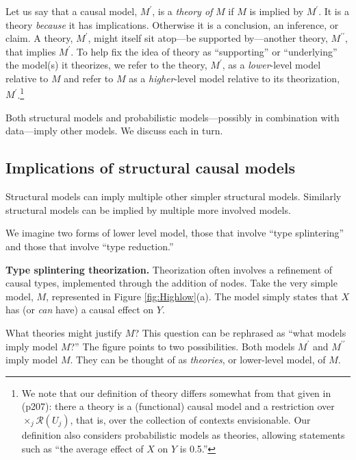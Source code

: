 \documentclass[
  12pt,
]{book}
\begin{document}
Let us say that a causal model, \(M^\prime\), is a \emph{theory of} \(M\) if \(M\) is implied by \(M^\prime\). It is a theory \emph{because} it has implications. Otherwise it is a conclusion, an inference, or claim. A theory, \(M^\prime\), might itself sit atop---be supported by---another theory, \(M^{\prime\prime}\), that implies \(M^\prime\). To help fix the idea of theory as ``supporting'' or ``underlying'' the model(s) it theorizes, we refer to the theory, \(M^\prime\), as a \emph{lower}-level model relative to \(M\) and refer to \(M\) as a \emph{higher}-level model relative to its theorization, \(M^\prime\).\footnote{We note that our definition of theory differs somewhat from that given in \citet{pearl2009causality} (p207): there a theory is a (functional) causal model and a restriction over \(\times_j \mathcal{R}(U_j)\), that is, over the collection of contexts envisionable. Our definition also considers probabilistic models as theories, allowing statements such as ``the average effect of \(X\) on \(Y\) is 0.5.''}

Both structural models and probabilistic models---possibly in combination with data---imply other models. We discuss each in turn.

\hypertarget{implications-of-structural-causal-models}{%
\subsection{Implications of structural causal models}\label{implications-of-structural-causal-models}}

Structural models can imply multiple other simpler structural models. Similarly structural models can be implied by multiple more involved models.

We imagine two forms of lower level model, those that involve ``type splintering'' and those that involve ``type reduction.''

\textbf{Type splintering theorization.} Theorization often involves a refinement of causal types, implemented through the addition of nodes.
Take the very simple model, \(M\), represented in Figure \ref{fig:Highlow}(a). The model simply states that \(X\) has (or \emph{can} have) a causal effect on \(Y\).

What theories might justify \(M\)? This question can be rephrased as ``what models imply model \(M\)?'' The figure points to two possibilities. Both models \(M^\prime\) and \(M^{\prime\prime}\) imply model \(M\). They can be thought of as \emph{theories}, or lower-level model, of \(M\).
\end{document}
